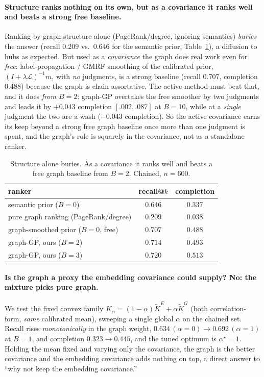 \documentclass[twoside]{article}
\theoremstyle{plain}
\theoremstyle{definition}
\begin{document}
\paragraph{Structure ranks nothing on its own, but as a covariance it ranks well and beats a strong free baseline.}
Ranking by graph structure alone (PageRank/degree, ignoring semantics) \emph{buries} the answer (recall $0.209$
vs.\ $0.646$ for the semantic prior, Table~\ref{tab:ablate}), a diffusion to hubs as expected. But used as a
\emph{covariance} the graph does real work even for \emph{free}: label-propagation / GMRF smoothing of the
calibrated prior, $(I+\lambda\mathcal L)^{-1}m$, with \emph{no} judgments, is a strong baseline (recall $0.707$,
completion $0.488$) because the graph is chain-assortative. The active method must beat that, and it does
\emph{from $B{=}2$}: graph-GP overtakes the free smoother by two judgments and leads it by $+0.043$ completion
$[.002,.087]$ at $B{=}10$, while at a \emph{single} judgment the two are a wash ($-0.043$ completion). So the
active covariance earns its keep beyond a strong free graph baseline once more than one judgment is spent, and the
graph's role is squarely in the covariance, not as a standalone ranker.
\begin{table}[t]\caption{Structure alone buries. As a covariance it ranks well and beats a free graph
baseline from $B{=}2$. Chained, $n{=}600$.}\label{tab:ablate}
\begin{center}\small
\begin{tabular}{lcc}
\toprule
ranker & recall@$k$ & completion \\ \midrule
semantic prior ($B{=}0$) & $0.646$ & $0.337$ \\
pure graph ranking (PageRank/degree) & $0.209$ & $0.038$ \\
graph-smoothed prior ($B{=}0$, free) & $0.707$ & $0.488$ \\
graph-GP, ours ($B{=}2$) & $0.714$ & $0.493$ \\
graph-GP, ours ($B{=}3$) & $0.720$ & $0.513$ \\
\bottomrule
\end{tabular}
\end{center}
\end{table}

\paragraph{Is the graph a proxy the embedding covariance could supply? No: the mixture picks pure graph.} We test
the fixed convex family $K_\alpha=(1-\alpha)\widetilde K^E+\alpha\widetilde K^G$ (both correlation-form,
\emph{same} calibrated mean), sweeping a single global $\alpha$ on the chained set. Recall rises
\emph{monotonically} in the graph weight, $0.634\,(\alpha{=}0)\to0.692\,(\alpha{=}1)$ at $B{=}1$, and completion
$0.323\to0.445$, and the tuned optimum is $\alpha^\star=1$. Holding the mean fixed and varying only the covariance, the
graph is the better covariance and the embedding covariance adds nothing on top, a direct answer to ``why not keep
the embedding covariance.''
\end{document}
